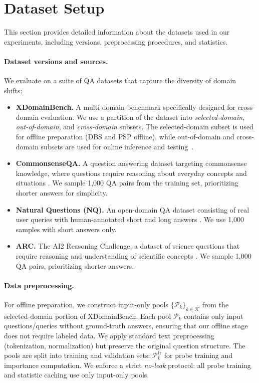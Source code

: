 \clearpage
{}

\section{Dataset Setup}
\label{app:dataset_setup}

This section provides detailed information about the datasets used in our experiments, including versions, preprocessing procedures, and statistics.

\paragraph{Dataset versions and sources.}
We evaluate on a suite of QA datasets that capture the diversity of domain shifts:
\begin{itemize}
    \item \textbf{XDomainBench.} A multi-domain benchmark specifically designed for cross-domain evaluation.
    We use a partition of the dataset into \emph{selected-domain}, \emph{out-of-domain}, and \emph{cross-domain} subsets.
    The selected-domain subset is used for offline preparation (DBS and PSP offline), while out-of-domain and cross-domain subsets are used for online inference and testing~\cite{gong2026xdomainbench}.
    \item \textbf{CommonsenseQA.} A question answering dataset targeting commonsense knowledge, where questions require reasoning about everyday concepts and situations \cite{talmor2019commonsenseqa}. We sample 1,000 QA pairs from the training set, prioritizing shorter answers for simplicity.
    \item \textbf{Natural Questions (NQ).} An open-domain QA dataset consisting of real user queries with human-annotated short and long answers \cite{kwiatkowski2019natural}. We use 1,000 samples with short answers only.
    \item \textbf{ARC.} The AI2 Reasoning Challenge, a dataset of science questions that require reasoning and understanding of scientific concepts \cite{clark2018arc}. We sample 1,000 QA pairs, prioritizing shorter answers.
\end{itemize}

\paragraph{Data preprocessing.}
For offline preparation, we construct input-only pools $\{\mathcal{P}_k\}_{k\in\mathcal{K}}$ from the selected-domain portion of XDomainBench.
Each pool $\mathcal{P}_k$ contains only input questions/queries without ground-truth answers, ensuring that our offline stage does not require labeled data.
We apply standard text preprocessing (tokenization, normalization) but preserve the original question structure.
The pools are split into training and validation sets: $\mathcal{P}_k^{\mathrm{tr}}$ for probe training and importance computation.
We enforce a strict \emph{no-leak} protocol: all probe training and statistic caching use only input-only pools.

